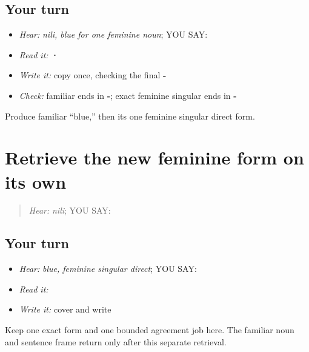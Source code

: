 \subsection*{Your turn}
\begin{itemize}
\raggedright
  \item \emph{Hear:} \emph{nili, blue for one feminine noun}; YOU SAY: \textbf{}
  \item \emph{Read it:} \textbf{ · }
  \item \emph{Write it:} copy \textbf{} once, checking the final \textbf{-}
  \item \emph{Check:} familiar \textbf{} ends in \textbf{-}; exact feminine singular \textbf{} ends in \textbf{-}
\end{itemize}

\begin{tcolorbox}[breakable,colback=teal!4,colframe=teal!35!black,title={Before you move on}]
Produce familiar “blue,” then its one feminine singular direct form.
\end{tcolorbox}
\section[\texorpdfstring{\pa{ਨੀਲੀ} (nili)}{ਨੀਲੀ (nili)}]{Retrieve the new feminine form on its own}

\label{lesson:PA-C209-nili-review}



\begin{quote}
\emph{Hear:} \emph{nili}; YOU SAY: \textbf{}
\end{quote}

\subsection*{Your turn}
\begin{itemize}
\raggedright
  \item \emph{Hear:} \emph{blue, feminine singular direct}; YOU SAY: \textbf{}
  \item \emph{Read it:} \textbf{}
  \item \emph{Write it:} cover and write \textbf{}
\end{itemize}

\begin{grammarlens}[title={Grammar Lens}]
Keep one exact form and one bounded agreement job here. The familiar noun and sentence frame return only after this separate retrieval.
\end{grammarlens}

